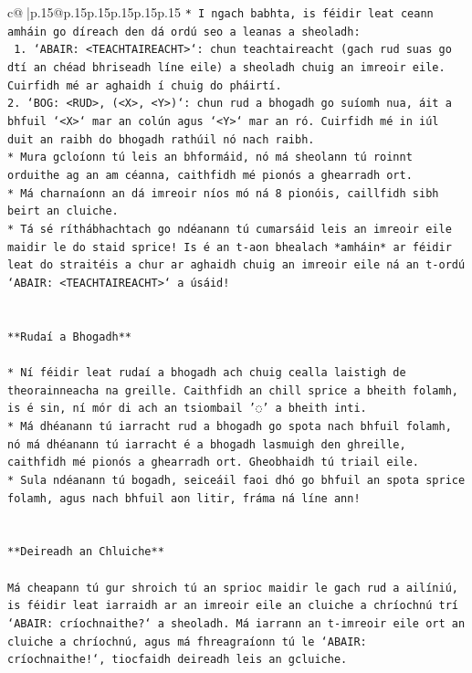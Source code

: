 \documentclass{article}
\begin{document}
{\begin{supertabular}{c@{$\;$}|p{.15\linewidth}@{}p{.15\linewidth}p{.15\linewidth}p{.15\linewidth}p{.15\linewidth}p{.15\linewidth}}
{{{\texttt{* I ngach babhta, is féidir leat ceann amháin go díreach den dá ordú seo a leanas a sheoladh:} \\
\texttt{ 1. `ABAIR: <TEACHTAIREACHT>`: chun teachtaireacht (gach rud suas go dtí an chéad bhriseadh líne eile) a sheoladh chuig an imreoir eile. Cuirfidh mé ar aghaidh í chuig do pháirtí.} \\
\texttt{2. `BOG: <RUD>, (<X>, <Y>)`: chun rud a bhogadh go suíomh nua, áit a bhfuil `<X>` mar an colún agus `<Y>` mar an ró. Cuirfidh mé in iúl duit an raibh do bhogadh rathúil nó nach raibh.} \\
\texttt{* Mura gcloíonn tú leis an bhformáid, nó má sheolann tú roinnt orduithe ag an am céanna, caithfidh mé pionós a ghearradh ort.} \\
\texttt{* Má charnaíonn an dá imreoir níos mó ná 8 pionóis, caillfidh sibh beirt an cluiche.} \\
\texttt{* Tá sé ríthábhachtach go ndéanann tú cumarsáid leis an imreoir eile maidir le do staid sprice! Is é an t{-}aon bhealach *amháin* ar féidir leat do straitéis a chur ar aghaidh chuig an imreoir eile ná an t{-}ordú `ABAIR: <TEACHTAIREACHT>` a úsáid!} \\
\\ 
\\ 
\texttt{**Rudaí a Bhogadh**} \\
\\ 
\texttt{* Ní féidir leat rudaí a bhogadh ach chuig cealla laistigh de theorainneacha na greille. Caithfidh an chill sprice a bheith folamh, is é sin, ní mór di ach an tsiombail '◌' a bheith inti.} \\
\texttt{* Má dhéanann tú iarracht rud a bhogadh go spota nach bhfuil folamh, nó má dhéanann tú iarracht é a bhogadh lasmuigh den ghreille, caithfidh mé pionós a ghearradh ort. Gheobhaidh tú triail eile.} \\
\texttt{* Sula ndéanann tú bogadh, seiceáil faoi dhó go bhfuil an spota sprice folamh, agus nach bhfuil aon litir, fráma ná líne ann!} \\
\\ 
\\ 
\texttt{**Deireadh an Chluiche**} \\
\\ 
\texttt{Má cheapann tú gur shroich tú an sprioc maidir le gach rud a ailíniú, is féidir leat iarraidh ar an imreoir eile an cluiche a chríochnú trí `ABAIR: críochnaithe?` a sheoladh. Má iarrann an t{-}imreoir eile ort an cluiche a chríochnú, agus má fhreagraíonn tú le `ABAIR: críochnaithe!`, tiocfaidh deireadh leis an gcluiche.} \\
}}}
\end{supertabular}}
\end{document}
